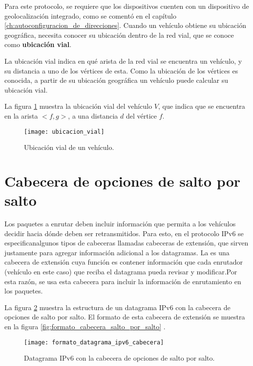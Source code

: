 Para este protocolo, se requiere que los dispositivos cuenten con un dispositivo
de geolocalización integrado, como se comentó en el capítulo
\ref{ch:autoconfiguracion_de_direcciones}. Cuando un vehículo obtiene su
ubicación geográfica, necesita conocer su ubicación dentro de la red vial, que
se conoce como \textbf{ubicación vial}.

La ubicación vial indica en qué arista de la red vial se encuentra un vehículo,
y su distancia a uno de los vértices de esta. Como la ubicación de los vértices
es conocida, a partir de su ubicación geográfica un vehículo puede calcular su
ubicación vial.

La figura \ref{fig:ubicacion_vial} muestra la ubicación vial del vehículo $V$,
que indica que se encuentra en la arista $<f,g>$, a una distancia $d$ del
vértice $f$.

\begin{figure}[th!]
\centering
\texttt{[image: ubicacion\_vial]} 
\decoRule
\caption[Ubicación vial de un vehículo]{Ubicación vial de un vehículo.}
\label{fig:ubicacion_vial}
\end{figure}

\section{Cabecera de opciones de salto por salto}
\label{sec:cabecera_opciones}

Los paquetes a enrutar deben incluir información que permita a los vehículos
decidir hacia dónde deben ser retransmitidos. Para esto, en el protocolo IPv6 se
especificanalgunos tipos de cabeceras llamadas cabeceras de extensión, que
sirven justamente para agregar información adicional a los datagramas. La
 es una cabecera de extensión
cuya función es contener información que cada enrutador (vehículo en este caso)
que reciba el datagrama pueda revisar y modificar.Por esta razón, se usa esta
cabecera para incluir la información de enrutamiento en los paquetes.

La figura \ref{fig:formato_datagrama_ipv6_cabecera} muestra la estructura de un
datagrama IPv6 con la cabecera de opciones de salto por salto. El formato de
esta cabecera de extensión se muestra en la figura
\ref{fig:formato_cabecera_salto_por_salto} \cite{RFC2460}.

\begin{figure}[th!]
\centering
\texttt{[image: formato\_datagrama\_ipv6\_cabecera]} 
\decoRule
\caption[Datagrama IPv6 con la cabecera de opciones de salto por
salto]{Datagrama IPv6 con la cabecera de opciones de salto por salto.}
\label{fig:formato_datagrama_ipv6_cabecera}
\end{figure}


